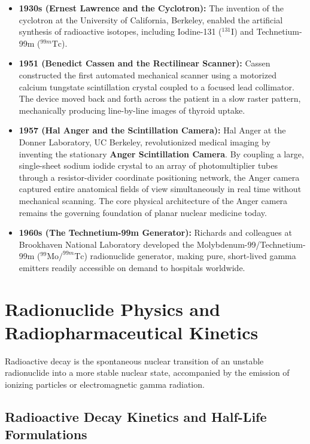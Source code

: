 \documentclass[11pt,a4paper]{article}
\begin{document}
\begin{itemize}[leftmargin=*]
    \item \textbf{1930s (Ernest Lawrence and the Cyclotron):} The invention of the cyclotron at the University of California, Berkeley, enabled the artificial synthesis of radioactive isotopes, including Iodine-131 ($^{131}\text{I}$) and Technetium-99m ($^{99m}\text{Tc}$).
    \item \textbf{1951 (Benedict Cassen and the Rectilinear Scanner):} Cassen constructed the first automated mechanical scanner using a motorized calcium tungstate scintillation crystal coupled to a focused lead collimator. The device moved back and forth across the patient in a slow raster pattern, mechanically producing line-by-line images of thyroid uptake.
    \item \textbf{1957 (Hal Anger and the Scintillation Camera):} Hal Anger at the Donner Laboratory, UC Berkeley, revolutionized medical imaging by inventing the stationary \textbf{Anger Scintillation Camera}. By coupling a large, single-sheet sodium iodide crystal to an array of photomultiplier tubes through a resistor-divider coordinate positioning network, the Anger camera captured entire anatomical fields of view simultaneously in real time without mechanical scanning. The core physical architecture of the Anger camera remains the governing foundation of planar nuclear medicine today.
    \item \textbf{1960s (The Technetium-99m Generator):} Richards and colleagues at Brookhaven National Laboratory developed the Molybdenum-99/Technetium-99m ($^{99}\text{Mo}/^{99m}\text{Tc}$) radionuclide generator, making pure, short-lived gamma emitters readily accessible on demand to hospitals worldwide.
\end{itemize}

\newpage
\section{Radionuclide Physics and Radiopharmaceutical Kinetics}

Radioactive decay is the spontaneous nuclear transition of an unstable radionuclide into a more stable nuclear state, accompanied by the emission of ionizing particles or electromagnetic gamma radiation.

\subsection{Radioactive Decay Kinetics and Half-Life Formulations}
\end{document}
